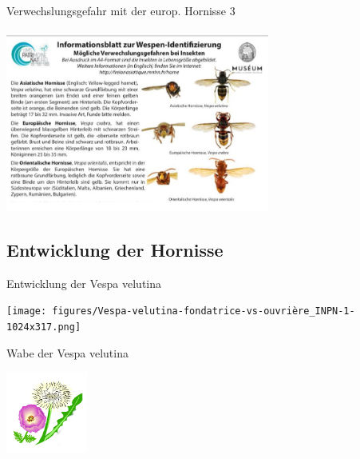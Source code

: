 \documentclass[aspectratio=169]{beamer}
\begin{document}
	
\begin{frame}{Verwechslungsgefahr mit der europ. Hornisse 3}
	\framesubtitle{} 
	\begin{center}	
		\includegraphics[width=0.65\textwidth]{figures/verwechselung.JPG}
	\end{center}
	\end{frame}


\subsection[Entwicklung]{Entwicklung der Hornisse}

\begin{frame}{Entwicklung der Vespa velutina}

	\begin{center}	
		\texttt{[image: figures/Vespa-velutina-fondatrice-vs-ouvrière\_INPN-1-1024x317.png]}
	\end{center}

	\end{frame}

	\begin{frame}{Wabe der Vespa velutina}
		\begin{center}	
			\includegraphics[width=0.2\textwidth]{figures/BH-Logo_Quat.png}
		\end{center}

		\end{frame}

\end{document}
